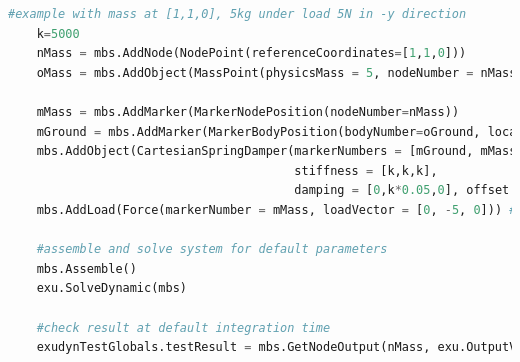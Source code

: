\label{miniExample_ObjectConnectorCartesianSpringDamper}
\pythonstyle
\begin{lstlisting}[language=Python, firstnumber=1]
    #example with mass at [1,1,0], 5kg under load 5N in -y direction
    k=5000
    nMass = mbs.AddNode(NodePoint(referenceCoordinates=[1,1,0]))
    oMass = mbs.AddObject(MassPoint(physicsMass = 5, nodeNumber = nMass))
    
    mMass = mbs.AddMarker(MarkerNodePosition(nodeNumber=nMass))
    mGround = mbs.AddMarker(MarkerBodyPosition(bodyNumber=oGround, localPosition = [1,1,0]))
    mbs.AddObject(CartesianSpringDamper(markerNumbers = [mGround, mMass], 
                                        stiffness = [k,k,k], 
                                        damping = [0,k*0.05,0], offset = [0,0,0]))
    mbs.AddLoad(Force(markerNumber = mMass, loadVector = [0, -5, 0])) #static solution=-5/5000=-0.001m

    #assemble and solve system for default parameters
    mbs.Assemble()
    exu.SolveDynamic(mbs)

    #check result at default integration time
    exudynTestGlobals.testResult = mbs.GetNodeOutput(nMass, exu.OutputVariableType.Displacement)[1]

\end{lstlisting}

